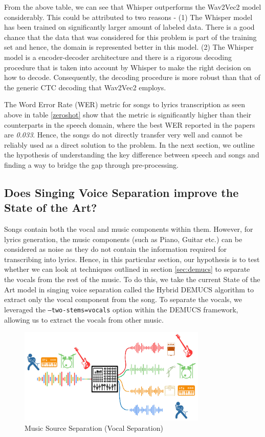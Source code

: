 From the above table, we can see that Whisper outperforms the Wav2Vec2 model considerably. This could be attributed to two reasons -  (1) The Whisper model has been trained on significantly larger amount of labeled data. There is a good chance that the data that was considered for this problem is part of the training set and hence, the domain is represented better in this model. (2) The Whisper model is a encoder-decoder architecture and there is a rigorous decoding procedure that is taken into account by Whisper to make the right decision on how to decode. Consequently, the decoding procedure is more robust than that of the generic CTC decoding that Wav2Vec2 employs. 


The  Word Error Rate (WER) metric for songs to lyrics transcription as seen above in table \ref{zeroshot} show that the metric is significantly higher than their counterparts in the speech domain, where the best WER reported in the papers are \textit{0.033}. Hence, the songs do not directly transfer very well and cannot be reliably used as a direct solution to the problem. In the next section, we outline the hypothesis of understanding the key difference between speech and songs and finding a way to bridge the gap through pre-processing.

\subsection{Does Singing Voice Separation improve the State of the Art?}

Songs contain both the vocal and music components within them. However, for lyrics generation, the music components (such as Piano, Guitar etc.) can be considered as noise as they do not contain the information required for transcribing into lyrics. Hence, in this particular section, our hypothesis is to test whether we can look at techniques outlined in section \ref{sec:demucs} to separate the vocals from the rest of the music. To do this, we take the current State of the Art model in singing voice separation called the Hybrid DEMUCS algorithm to extract only the vocal component from the song. To separate the vocals, we leveraged the \texttt{--two-stems=vocals} option within the DEMUCS framework, allowing us to extract the vocals from other music.

\begin{figure}
    \centering
    \includegraphics[width=0.8\textwidth]{05-research study/figures/sourceseparation.pdf}
    \caption{Music Source Separation (Vocal Separation) \cite{opensourceseparation:book}}
    \label{fig:musicsourceseparation}
\end{figure}

